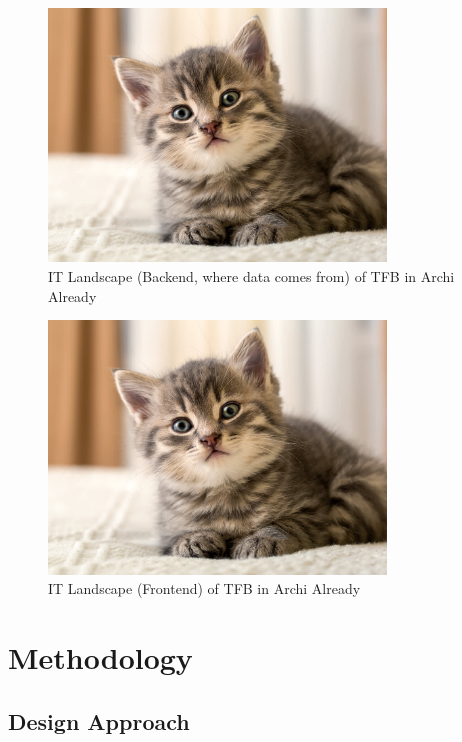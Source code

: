 \documentclass{utitcphd_overleaf}
\begin{document}
\begin{figure}[ht]
  \centering
  \includegraphics[width=0.8\textwidth]{my_images/kitten.jpeg}
  \caption{IT Landscape (Backend, where data comes from) of TFB in Archi Already}
  \label{fig:yourlabel}
\end{figure}


\begin{figure}[ht]
  \centering
  \includegraphics[width=0.8\textwidth]{my_images/kitten.jpeg}
  \caption{IT Landscape (Frontend) of TFB in Archi Already}
  \label{fig:yourlabel}
\end{figure}

\chapter{Methodology}
\label{chap:management}


\section{Design Approach}
\end{document}
